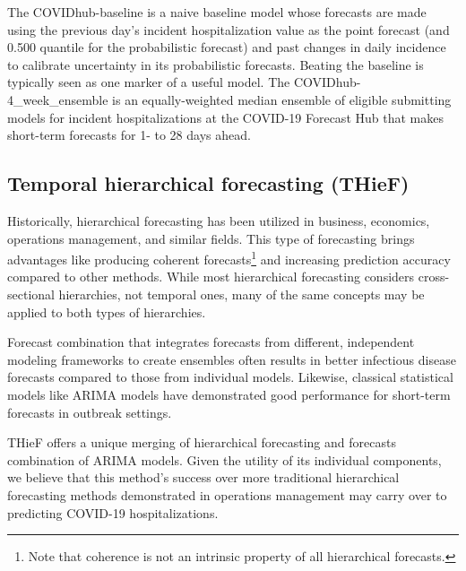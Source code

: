 \documentclass[12pt]{article}
\begin{document}
The COVIDhub-baseline is a naive baseline model whose forecasts are made using the previous day's incident hospitalization value as the point forecast (and 0.500 quantile for the probabilistic forecast) and past changes in daily incidence to calibrate uncertainty in its probabilistic forecasts\cite{cramer}. Beating the baseline is typically seen as one marker of a useful model. The COVIDhub-4\_week\_ensemble is an equally-weighted median ensemble of eligible submitting models for incident hospitalizations at the COVID-19 Forecast Hub that makes short-term forecasts for 1- to 28 days ahead\cite{ensembles_info}.


\subsection{Temporal hierarchical forecasting (THieF)} \label{thief}
Historically, hierarchical forecasting has been utilized in business, economics, operations management, and similar fields. This type of forecasting brings advantages like producing coherent forecasts\footnote{Note that coherence is not an intrinsic property of all hierarchical forecasts.} and increasing prediction accuracy compared to other methods\cite{thief, hts_talk}. While most hierarchical forecasting considers cross-sectional hierarchies, not temporal ones, many of the same concepts may be applied to both types of hierarchies.

Forecast combination that integrates forecasts from different, independent modeling frameworks to create ensembles often results in better infectious disease forecasts compared to those from individual models\cite{ensemble_accuracy, ensemble_methods, timmermann2006, clemen1989}. Likewise, classical statistical models like ARIMA models have demonstrated good performance for short-term forecasts in outbreak settings\cite{lauer}.

THieF offers a unique merging of hierarchical forecasting and forecasts combination of ARIMA models. Given the utility of its individual components, we believe that this method's success over more traditional hierarchical forecasting methods demonstrated in operations management\cite{thief} may carry over to predicting COVID-19 hospitalizations.
\end{document}
